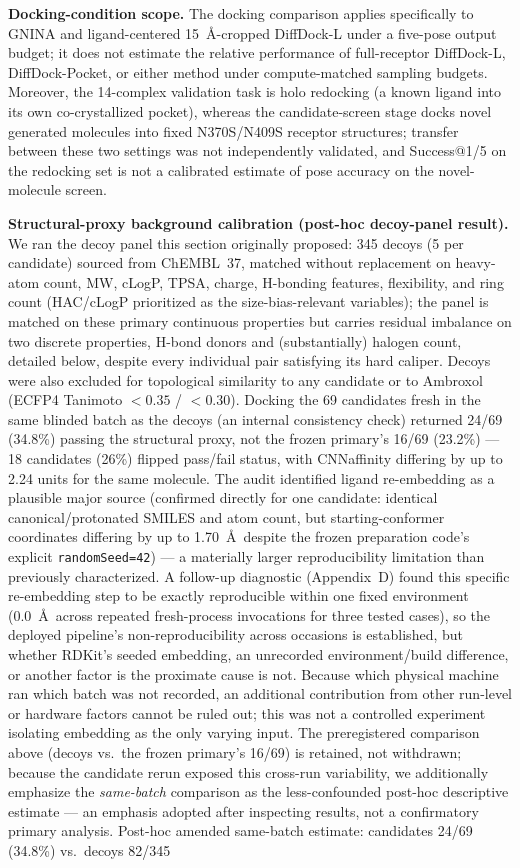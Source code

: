 \documentclass{article}
\begin{document}
\textbf{Docking-condition scope.} The docking comparison applies specifically to GNINA and ligand-centered 15~\AA-cropped DiffDock-L under a five-pose output budget; it does not estimate the relative performance of full-receptor DiffDock-L, DiffDock-Pocket, or either method under compute-matched sampling budgets. Moreover, the 14-complex validation task is holo redocking (a known ligand into its own co-crystallized pocket), whereas the candidate-screen stage docks novel generated molecules into fixed N370S/N409S receptor structures; transfer between these two settings was not independently validated, and Success@1/5 on the redocking set is not a calibrated estimate of pose accuracy on the novel-molecule screen.

\textbf{Structural-proxy background calibration (post-hoc decoy-panel result).} We ran the decoy panel this section originally proposed: 345 decoys (5 per candidate) sourced from ChEMBL~37, matched without replacement on heavy-atom count, MW, cLogP, TPSA, charge, H-bonding features, flexibility, and ring count (HAC/cLogP prioritized as the size-bias-relevant variables); the panel is matched on these primary continuous properties but carries residual imbalance on two discrete properties, H-bond donors and (substantially) halogen count, detailed below, despite every individual pair satisfying its hard caliper. Decoys were also excluded for topological similarity to any candidate or to Ambroxol (ECFP4 Tanimoto $<0.35$ / $<0.30$). Docking the 69 candidates fresh in the same blinded batch as the decoys (an internal consistency check) returned 24/69 (34.8\%) passing the structural proxy, not the frozen primary's 16/69 (23.2\%) --- 18 candidates (26\%) flipped pass/fail status, with CNNaffinity differing by up to 2.24 units for the same molecule. The audit identified ligand re-embedding as a plausible major source (confirmed directly for one candidate: identical canonical/protonated SMILES and atom count, but starting-conformer coordinates differing by up to 1.70~\AA\ despite the frozen preparation code's explicit \texttt{randomSeed=42}) --- a materially larger reproducibility limitation than previously characterized. A follow-up diagnostic (Appendix~D) found this specific re-embedding step to be exactly reproducible within one fixed environment (0.0~\AA\ across repeated fresh-process invocations for three tested cases), so the deployed pipeline's non-reproducibility across occasions is established, but whether RDKit's seeded embedding, an unrecorded environment/build difference, or another factor is the proximate cause is not. Because which physical machine ran which batch was not recorded, an additional contribution from other run-level or hardware factors cannot be ruled out; this was not a controlled experiment isolating embedding as the only varying input. The preregistered comparison above (decoys vs.\ the frozen primary's 16/69) is retained, not withdrawn; because the candidate rerun exposed this cross-run variability, we additionally emphasize the \emph{same-batch} comparison as the less-confounded post-hoc descriptive estimate --- an emphasis adopted after inspecting results, not a confirmatory primary analysis. Post-hoc amended same-batch estimate: candidates 24/69 (34.8\%) vs.\ decoys 82/345 
\end{document}
